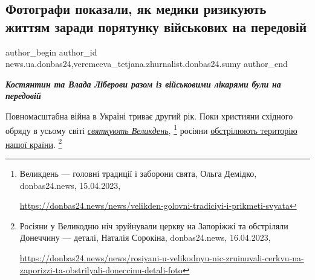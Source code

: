  
 
 
 
 
 
\subsection{Фотографи показали, як медики ризикують життям заради порятунку військових на передовій}
\label{sec:17_04_2023.stz.news.ua.donbas24.1.fotografy_medyky_porjatunok_vijskovyh_peredova}
 
\ifcmt
 author_begin
   author_id news.ua.donbas24,veremeeva_tetjana.zhurnalist.donbas24.sumy
 author_end
\fi

\begin{center}
  \em\bfseries\Large
Костянтин та Влада Ліберови разом із військовими лікарями були на передовій
\end{center}

Повномасштабна війна в Україні триває другий рік. Поки християни східного
обряду в усьому світі \href{https://donbas24.news/news/velikden-golovni-tradiciyi-i-prikmeti-svyata}{\emph{святкують Великдень}},%
\footnote{Великдень — головні традиції і заборони свята, Ольга Демідко, donbas24.news, 15.04.2023, \par\url{https://donbas24.news/news/velikden-golovni-tradiciyi-i-prikmeti-svyata}}
росіяни \href{https://donbas24.news/news/rosiyani-u-velikodnyu-nic-zruinuvali-cerkvu-na-zaporizzi-ta-obstrilyali-doneccinu-detali-foto}{обстрілюють територію нашої країни}.%
\footnote{Росіяни у Великодню ніч зруйнували церкву на Запоріжжі та обстріляли Донеччину — деталі, Наталія Сорокіна, donbas24.news, 16.04.2023, \par\url{https://donbas24.news/news/rosiyani-u-velikodnyu-nic-zruinuvali-cerkvu-na-zaporizzi-ta-obstrilyali-doneccinu-detali-foto}}

